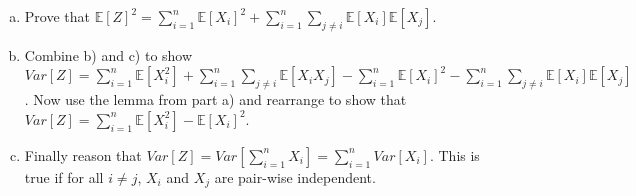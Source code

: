 \documentclass[]{article}
\newif\ifsolutions
\renewcommand{\answer}[1]{{\color{mydarkblue}\textbf{Solution:}#1}}
\def \exx {\mathbb{E}}
\begin{document}
\begin{qunlist}
\begin{enumerate}[a)]
\qpart
\item Prove that $\exx[Z]^2 = \sum\nolimits_{i=1}^n \exx[X_i]^2 + \sum_{i=1}^n \sum\limits_{j \neq i} \exx[X_i] \exx[X_j]$.

\ifsolutions{ \answer {
We calculate $\exx[Z]$ and then square it. By linearity of expectation, $\exx[Z] = \exx[X_1] + \exx[X_2] + \cdots + \exx[X_n]$. So, now we wish to calculate $(\exx[X_1] + \cdots + \exx[X_n])^2$. This calculation is similar to what we did before. We will have a term for each $i$ of $\exx[X_i]\exx[X_i]$ and we will have a term for every possible product of $\exx[X_i]$ and $\exx[X_j]$ where order matters and $i \neq j$. Ultimately, 
\begin{align*}
\exx[Z]^2 &= \sum\nolimits_{i=1}^n \exx[X_i]\exx[X_i] + \sum_{i=1}^n \sum\limits_{j \neq i} \exx[X_i] \exx[X_j] \\ 
&= \sum\nolimits_{i=1}^n \exx[X_i]^2 + \sum_{i=1}^n \sum\limits_{j \neq i} \exx[X_i] \exx[X_j]
\end{align*}
}}
\fi


\qpart
\item Combine b) and c) to show $Var[Z] = \sum\nolimits_{i=1}^n \exx[X_i^2] + \sum_{i=1}^n \sum\limits_{j \neq i} \exx[X_iX_j] -  \sum\nolimits_{i=1}^n \exx[X_i]^2 - \sum_{i=1}^n \sum\limits_{j \neq i} \exx[X_i] \exx[X_j]$. Now use the lemma from part a) and rearrange to show that $Var[Z] = \sum\nolimits_{i=1}^n \exx[X_i^2] - \exx[X_i]^2$.

\ifsolutions{ \answer {
\begin{align*}
Var[Z] &= \exx[Z^2] - \exx[Z]^2 \\
&= \sum\nolimits_{i=1}^n \exx[X_i^2] + \sum_{i=1}^n \sum_{j \neq i} \exx[X_iX_j] - \sum\nolimits_{i=1}^n \exx[X_i]^2 + \sum_{i=1}^n \sum\limits_{j \neq i} \exx[X_i] \exx[X_j]  &\quad\text{subtract answer in c) from answer in b)}\\
&= \sum\nolimits_{i=1}^n (\exx[X_i^2] - \exx[X_i]^2) + \sum\limits_{j \neq i} ( \exx[X_iX_j] - \exx[X_i]\exx[X_j]) 
&\quad\text{re-group summations} \\ 
&= \sum\nolimits_{i=1}^n (\exx[X_i^2] - \exx[X_i]^2) &\quad\text{$X_i$'s are pair-wise independent, use lemma}
\end{align*}
}}
\fi

\qpart
\item Finally reason that $Var[Z] = Var[\sum\nolimits_{i=1}^n X_i] =    \sum\nolimits_{i=1}^n Var[X_i]$. This is true if for all $i \neq j$, $X_i$ and $X_j$ are pair-wise independent.


\end{enumerate}
\end{qunlist}
\end{document}
